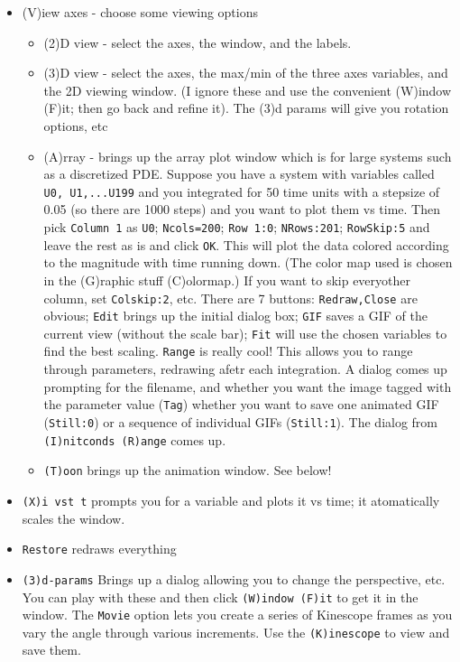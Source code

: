 \documentclass{article}
\begin{document}
\begin{itemize}
\begin{itemize}
\end{itemize}
\item (V)iew axes - choose some viewing options
\begin{itemize}
\item (2)D view - select the axes, the window, and the labels.
\item (3)D view - select the axes, the max/min of the three axes variables, and the 2D viewing window. (I ignore these and use the convenient (W)indow (F)it; then go back and refine it). The (3)d params will give you rotation options, etc
\item (A)rray - brings up the array plot window which is for large systems such as a discretized PDE. Suppose you have a system with variables called {\tt U0, U1,...U199} and you integrated for 50 time units with a stepsize of 0.05 (so there are 1000 steps) and you  want to plot them vs time. Then pick {\tt Column 1} as {\tt U0}; {\tt Ncols=200}; {\tt Row 1:0}; {\tt NRows:201}; {\tt RowSkip:5} and leave the rest as is and click {\tt OK}. This will plot the data colored according to the magnitude with time running down. (The color map used is chosen in the (G)raphic stuff (C)olormap.)  If you want to skip everyother column, set {\tt Colskip:2}, etc. There are 7 buttons: {\tt Redraw,Close} are obvious; {\tt Edit} brings up the initial dialog box; {\tt GIF} saves a GIF of the current view (without the scale bar); {\tt Fit} will use the chosen variables to find the best scaling. {\tt Range} is really cool! This allows you to range through parameters, redrawing afetr each integration. A dialog comes up prompting for the filename, and whether you want the image tagged with the parameter value ({\tt Tag})  whether you want to save one animated GIF ({\tt Still:0}) or a sequence of individual GIFs ({\tt Still:1}). The dialog from {\tt (I)nitconds (R)ange} comes up.
\item {\tt (T)oon} brings up the animation window. See below!
\end{itemize}
\item {\tt (X)i vst t} prompts you for a variable and plots it vs time; it atomatically scales the window.
\item {\tt Restore} redraws everything
\item {\tt (3)d-params} Brings up a dialog allowing you to change the perspective, etc. You can play with these and then click {\tt (W)indow (F)it} to get it in the window. The {\tt Movie} option lets you create a series of Kinescope frames as you vary the angle through various increments.  Use the {\tt (K)inescope} to view and save them.
\end{itemize}
\end{document}

